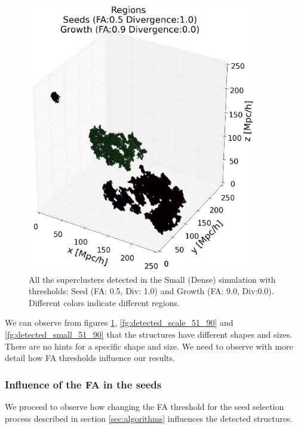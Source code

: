 \documentclass[12pt]{article}
\begin{document}
\begin{figure}[ht]
\begin{center}
  \includegraphics[width=0.9\textwidth]{groups/3d/seeds_FA_5/regions_nonoise_seeds_FA_05_Trace_10_search_FA_09_Trace_00_.png}
\caption{All the superclusters detected in the Small (Dense) simulation with thresholds: Seed (FA: 0.5, Div: 1.0) and Growth (FA: 9.0, Div:0.0). Different colors indicate different regions.}
\label{fg:detected_all_51_90}
\end{center}
\end{figure}
\FloatBarrier

\begin{par}
We can observe from figures
 \ref{fg:detected_all_51_90},
  \ref{fg:detected_scale_51_90} and
   \ref{fg:detected_small_51_90} that the
    structures have different shapes and sizes.
     There are no hints for a specific shape and
      size. We need to observe with more detail how
       FA thresholds influence our results.
\end{par}

\subsubsection{Influence of the FA in the seeds}
\label{sec:infl_FA_seed}
\begin{par}
We proceed to observe how changing the FA threshold
 for the seed selection process described in
  section \ref{sec:algorithms} influences the
   detected structures. 
\end{par}
\end{document}
